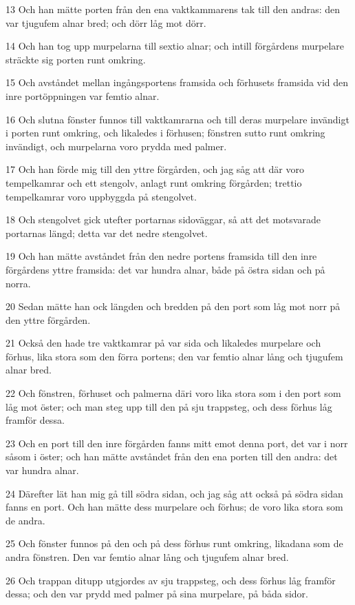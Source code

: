 \par 13 Och han mätte porten från den ena vaktkammarens tak till den andras: den var tjugufem alnar bred; och dörr låg mot dörr.
\par 14 Och han tog upp murpelarna till sextio alnar; och intill förgårdens murpelare sträckte sig porten runt omkring.
\par 15 Och avståndet mellan ingångsportens framsida och förhusets framsida vid den inre portöppningen var femtio alnar.
\par 16 Och slutna fönster funnos till vaktkamrarna och till deras murpelare invändigt i porten runt omkring, och likaledes i förhusen; fönstren sutto runt omkring invändigt, och murpelarna voro prydda med palmer.
\par 17 Och han förde mig till den yttre förgården, och jag såg att där voro tempelkamrar och ett stengolv, anlagt runt omkring förgården; trettio tempelkamrar voro uppbyggda på stengolvet.
\par 18 Och stengolvet gick utefter portarnas sidoväggar, så att det motsvarade portarnas längd; detta var det nedre stengolvet.
\par 19 Och han mätte avståndet från den nedre portens framsida till den inre förgårdens yttre framsida: det var hundra alnar, både på östra sidan och på norra.
\par 20 Sedan mätte han ock längden och bredden på den port som låg mot norr på den yttre förgården.
\par 21 Också den hade tre vaktkamrar på var sida och likaledes murpelare och förhus, lika stora som den förra portens; den var femtio alnar lång och tjugufem alnar bred.
\par 22 Och fönstren, förhuset och palmerna däri voro lika stora som i den port som låg mot öster; och man steg upp till den på sju trappsteg, och dess förhus låg framför dessa.
\par 23 Och en port till den inre förgården fanns mitt emot denna port, det var i norr såsom i öster; och han mätte avståndet från den ena porten till den andra: det var hundra alnar.
\par 24 Därefter lät han mig gå till södra sidan, och jag såg att också på södra sidan fanns en port. Och han mätte dess murpelare och förhus; de voro lika stora som de andra.
\par 25 Och fönster funnos på den och på dess förhus runt omkring, likadana som de andra fönstren. Den var femtio alnar lång och tjugufem alnar bred.
\par 26 Och trappan ditupp utgjordes av sju trappsteg, och dess förhus låg framför dessa; och den var prydd med palmer på sina murpelare, på båda sidor.
